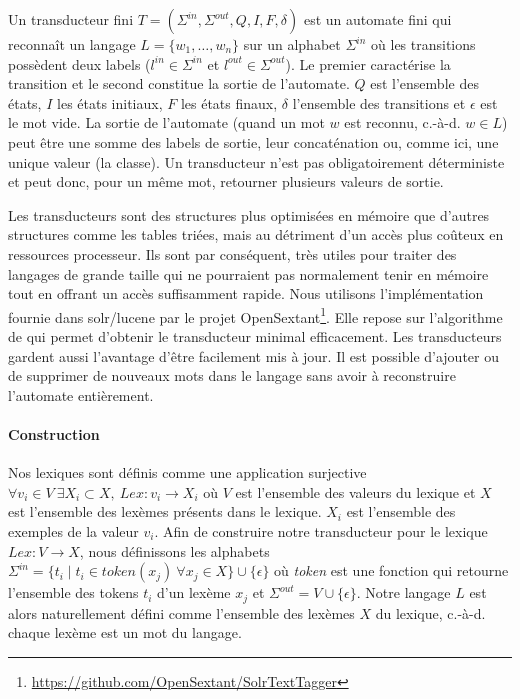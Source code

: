 \begin{definition}[FST]
    Un transducteur fini $T = (\Sigma^{in}, \Sigma^{out}, Q, I, F, \delta)$ est un automate fini qui reconnaît un langage $L = \{w_1, \dots, w_n\}$ sur un alphabet $\Sigma^{in}$ où les transitions possèdent deux labels ($l^{in} \in \Sigma^{in}$ et $l^{out} \in \Sigma^{out}$).
    Le premier caractérise la transition et le second constitue la sortie de l'automate.
    $Q$ est l'ensemble des états, $I$ les états initiaux, $F$ les états finaux, $\delta$ l'ensemble des transitions et $\epsilon$ est le mot vide.
    La sortie de l'automate (quand un mot $w$ est reconnu, c.-à-d. $w \in L$) peut être une somme des labels de sortie, leur concaténation ou, comme ici, une unique valeur (la classe).
    Un transducteur n'est pas obligatoirement déterministe et peut donc, pour un même mot, retourner plusieurs valeurs de sortie.
\end{definition}

Les transducteurs sont des structures plus optimisées en mémoire que d'autres structures comme les tables triées, mais au détriment d'un accès plus coûteux en ressources processeur.
Ils sont par conséquent, très utiles pour traiter des langages de grande taille qui ne pourraient pas normalement tenir en mémoire tout en offrant un accès suffisamment rapide.
Nous utilisons l'implémentation fournie dans \gls{solr}/\gls{lucene} par le projet OpenSextant\footnote{\url{https://github.com/OpenSextant/SolrTextTagger}}.
Elle repose sur l'algorithme de \cite{mihovDirectConstructionMinimal2001} qui permet d'obtenir le transducteur minimal efficacement.
Les transducteurs gardent aussi l'avantage d'être facilement mis à jour.
Il est possible d'ajouter ou de supprimer de nouveaux mots dans le langage sans avoir à reconstruire l'automate entièrement.

\paragraph{Construction}
Nos lexiques sont définis comme une application surjective $\forall v_i \in V\ \exists X_i \subset X,\ Lex: v_i \rightarrow X_i$ où $V$ est l'ensemble des valeurs du lexique et $X$ est l'ensemble des lexèmes présents dans le lexique.
$X_i$ est l'ensemble des exemples de la valeur $v_i$.
Afin de construire notre transducteur pour le lexique $Lex: V \rightarrow X$, nous définissons les alphabets $\Sigma^{in} = \{t_i \mid t_i \in \textit{token}(x_j)\ \forall x_j \in X\} \cup \{\epsilon\}$ où \textit{token} est une fonction qui retourne l'ensemble des tokens $t_i$ d'un lexème $x_j$ et $\Sigma^{out} = V \cup \{\epsilon\}$.
Notre langage $L$ est alors naturellement défini comme l'ensemble des lexèmes $X$ du lexique, c.-à-d. chaque lexème est un mot du langage.

